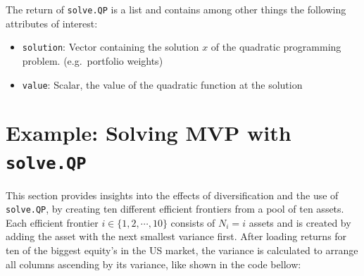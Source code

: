 \documentclass[
  oneside]{book}
\newenvironment{Shaded}{\begin{snugshade}}{\end{snugshade}}
\newcommand{\AttributeTok}[1]{\textcolor[rgb]{0.77,0.63,0.00}{#1}}
\newcommand{\CommentTok}[1]{\textcolor[rgb]{0.56,0.35,0.01}{\textit{#1}}}
\newcommand{\FunctionTok}[1]{\textcolor[rgb]{0.00,0.00,0.00}{#1}}
\newcommand{\NormalTok}[1]{#1}
\newcommand{\OtherTok}[1]{\textcolor[rgb]{0.56,0.35,0.01}{#1}}
\newcommand{\SpecialCharTok}[1]{\textcolor[rgb]{0.00,0.00,0.00}{#1}}
\newcommand{\StringTok}[1]{\textcolor[rgb]{0.31,0.60,0.02}{#1}}
\providecommand{\tightlist}{%
  \setlength{\itemsep}{0pt}\setlength{\parskip}{0pt}}
\begin{document}
The return of \texttt{solve.QP} is a list and contains among other things the following attributes of interest:

\begin{itemize}
\tightlist
\item
  \texttt{solution}: Vector containing the solution \(x\) of the quadratic programming problem. (e.g.~portfolio weights)
\item
  \texttt{value}: Scalar, the value of the quadratic function at the solution
\end{itemize}

\hypertarget{example-solving-mvp-with-solve.qp}{%
\section{\texorpdfstring{Example: Solving MVP with \texttt{solve.QP}}{Example: Solving MVP with solve.QP}}\label{example-solving-mvp-with-solve.qp}}

This section provides insights into the effects of diversification and the use of \texttt{solve.QP}, by creating ten different efficient frontiers from a pool of ten assets. Each efficient frontier \(i \in \{1, 2, \cdots, 10\}\) consists of \(N_i = i\) assets and is created by adding the asset with the next smallest variance first. After loading returns for ten of the biggest equity's in the US market, the variance is calculated to arrange all columns ascending by its variance, like shown in the code bellow:

\begin{Shaded}
\end{Shaded}
\end{document}
